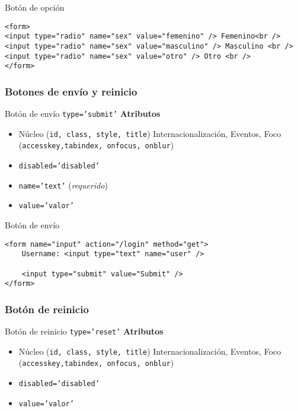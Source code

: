 \documentclass{beamer}
\begin{document}
\begin{frame}[fragile]{Botón de opción} %
\footnotesize{
\begin{lstlisting}
<form>
<input type="radio" name="sex" value="femenino" /> Femenino<br />
<input type="radio" name="sex" value="masculino" /> Masculino <br />
<input type="radio" name="sex" value="otro" /> Otro <br />
</form>    
\end{lstlisting}
}
\end{frame}

\subsubsection{Botones de envío y reinicio} 

\begin{frame}{Botón de envío \texttt{type='submit'}} %
    \textbf{Atributos}
    \begin{itemize}
        \item Núcleo (\texttt{id, class, style, title}) Internacionalización,
        Eventos, Foco (\texttt{accesskey,tabindex, onfocus, onblur})
        \item \texttt{disabled='disabled'}
        \item \texttt{name='text'} (\textit{requerido})
        \item \texttt{value='valor'}
    \end{itemize}
\end{frame}

\begin{frame}[fragile]{Botón de envío} %
    \begin{lstlisting}
<form name="input" action="/login" method="get">
    Username: <input type="text" name="user" />

    <input type="submit" value="Submit" />
</form>        
    \end{lstlisting}
\end{frame}

\subsubsection{Botón de reinicio}

\begin{frame}[fragile]{Botón de reinicio \texttt{type='reset'}} %
    \textbf{Atributos}
    \begin{itemize}
        \item Núcleo (\texttt{id, class, style, title}) Internacionalización,
        Eventos, Foco (\texttt{accesskey,tabindex, onfocus, onblur})
        \item \texttt{disabled='disabled'}
        \item \texttt{value='valor'}
    \end{itemize}
    
\end{frame}
\end{document}

